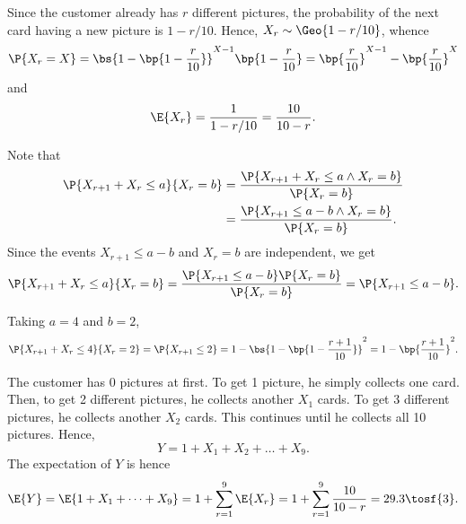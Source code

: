 \begin{solution}
    \begin{ppart}
        Since the customer already has $r$ different pictures, the probability of the next card having a new picture is $1 - r/10$. Hence, $X_r \sim \Geo{1 - r/10}$, whence \[\P{X_r = X} = \bs{1 - \bp{1 - \frac{r}{10}}}^{X - 1} \bp{1 - \frac{r}{10}} = \bp{\frac{r}{10}}^{X-1} - \bp{\frac{r}{10}}^{X}\] and \[\E{X_r} = \frac{1}{1- r/10} = \frac{10}{10 - r}.\]
    \end{ppart}
    \begin{ppart}
        Note that
        \begin{align*}
            \P{X_{r+1} + X_r \leq a}{X_r = b} &= \frac{\P{X_{r+1} + X_r \leq a \land X_r = b}}{\P{X_r = b}}\\
            &= \frac{\P{X_{r+1} \leq a - b \land X_r = b}}{\P{X_r = b}}.
        \end{align*}
        Since the events $X_{r+1} \leq a - b$ and $X_r = b$ are independent, we get \[\P{X_{r+1} + X_r \leq a}{X_r = b} = \frac{\P{X_{r+1} \leq a - b} \P{X_r = b}}{\P{X_r = b}} = \P{X_{r+1} \leq a - b}.\]

        Taking $a = 4$ and $b = 2$, \[\P{X_{r+1} + X_r \leq 4}{X_r = 2} = \P{X_{r+1} \leq 2} = 1 - \bs{1 - \bp{1 - \frac{r + 1}{10}}}^2 = 1 - \bp{\frac{r+1}{10}}^2.\]
    \end{ppart}
    \begin{ppart}
        The customer has 0 pictures at first. To get 1 picture, he simply collects one card. Then, to get 2 different pictures, he collects another $X_1$ cards. To get 3 different pictures, he collects another $X_2$ cards. This continues until he collects all 10 pictures. Hence, \[Y = 1 + X_1 + X_2 + \dots + X_9.\] The expectation of $Y$ is hence \[\E{Y} = \E{1 + X_1 + \dots + X_9} = 1 + \sum_{r = 1}^9 \E{X_r} = 1 + \sum_{r = 1}^9 \frac{10}{10 - r} = 29.3 \tosf{3}.\]
    \end{ppart}
\end{solution}